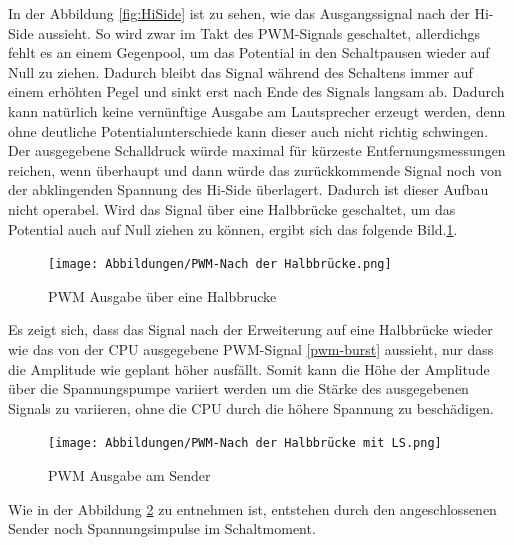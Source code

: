 In der Abbildung \ref{fig:HiSide} ist zu sehen, wie das Ausgangssignal nach der Hi-Side aussieht. So wird zwar im Takt des PWM-Signals geschaltet, allerdichgs fehlt es an einem Gegenpool, um das Potential in den Schaltpausen wieder auf Null zu ziehen. Dadurch bleibt das Signal während des Schaltens immer auf einem erhöhten Pegel und sinkt erst nach Ende des Signals langsam ab. Dadurch kann natürlich keine vernünftige Ausgabe am Lautsprecher erzeugt werden, denn ohne deutliche Potentialunterschiede kann dieser auch nicht richtig schwingen. Der ausgegebene Schalldruck würde maximal für kürzeste Entfernungsmessungen reichen, wenn überhaupt und dann würde das zurückkommende Signal noch von der abklingenden Spannung des Hi-Side überlagert. Dadurch ist dieser Aufbau nicht operabel.\newpage
Wird das Signal über eine Halbbrücke geschaltet, um das Potential auch auf Null ziehen zu können, ergibt sich das folgende Bild.\ref{fig:Halfbridge}.
\begin{figure}[H]
\texttt{[image: Abbildungen/PWM-Nach der Halbbrücke.png]}\caption{PWM Ausgabe über eine Halbbrucke}\label{fig:Halfbridge}
\end{figure}
Es zeigt sich, dass das Signal nach der Erweiterung auf eine Halbbrücke wieder wie das von der CPU ausgegebene PWM-Signal \ref{pwm-burst} aussieht, nur dass die Amplitude wie geplant höher ausfällt. Somit kann die Höhe der Amplitude über die Spannungspumpe variiert werden um die Stärke des ausgegebenen Signals zu variieren, ohne die CPU durch die höhere Spannung zu beschädigen.
\begin{figure}[H]
\texttt{[image: Abbildungen/PWM-Nach der Halbbrücke mit LS.png]}\caption{PWM Ausgabe am Sender}\label{fig:Sender}
\end{figure}
Wie in der Abbildung \ref{fig:Sender} zu entnehmen ist, entstehen durch den angeschlossenen Sender noch Spannungsimpulse im Schaltmoment.

